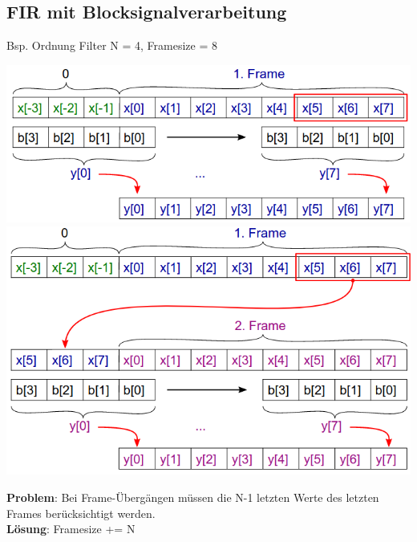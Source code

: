 \documentclass[10pt,a4paper]{article}
\begin{document}
\subsection{FIR mit Blocksignalverarbeitung}
Bsp. Ordnung Filter N = 4, Framesize = 8\\
  \begin{center}
      \includegraphics[width=.25\textwidth]{./img/firframe1.png}
      \includegraphics[width=.25\textwidth]{./img/firframe2.png}
  \end{center}
\textbf{Problem}: Bei Frame-Übergängen müssen die N-1 letzten Werte des letzten Frames berücksichtigt werden.\\
\textbf{Lösung}: Framesize += N
\end{document}
